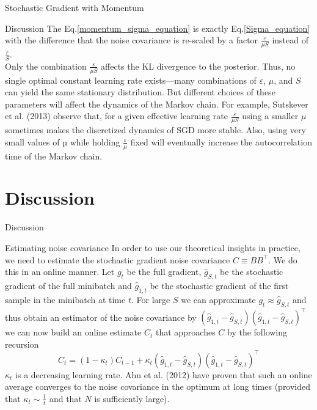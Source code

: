\documentclass{beamer}
\begin{document}
\begin{frame}{Stochastic Gradient with Momentum}
    \begin{block}{Discussion}
        The Eq.\ref{momentum_sigma_equation} is exactly Eq.\ref{Sigma_equation} with the difference that the noise covariance is re-scaled by a factor $\frac{\varepsilon}{\mu S}$ instead of $\frac{\varepsilon}{S}$. \\
        Only the combination $\frac{\varepsilon}{\mu S}$ affects the KL divergence to the posterior. Thus, no single optimal constant learning rate exists—many combinations of $\varepsilon$, $\mu$, and $S$ can yield the same stationary distribution. But different choices of these parameters will affect the dynamics of the Markov chain. For example, Sutskever et al. (2013) observe that, for a given effective learning rate $\frac{\varepsilon}{\mu S}$ using a smaller $\mu$ sometimes makes the discretized dynamics of SGD more stable. Also, using very small values of µ while holding $\frac{\varepsilon}{\mu}$ fixed will eventually increase the autocorrelation time of the Markov chain. 
    \end{block}
\end{frame}

\section{Discussion}

\begin{frame}{Discussion}
    \begin{block}{Estimating noise covariance}
        In order to use our theoretical insights in practice, we need to estimate the stochastic gradient noise covariance $C \equiv BB^\top$. We do this in an online manner. Let $g_t$ be the full gradient, $\hat{g}_{S,t}$ be the stochastic gradient of the full minibatch and $\hat{g}_{1,t}$ be the stochastic gradient of the first sample in the minibatch at time $t$. For large $S$ we can approximate $g_t \approx \hat{g}_{S,t}$ and thus obtain an estimator of the noise covariance by $(\hat{g}_{1,t} - \hat{g}_{S,t})(\hat{g}_{1,t} - \hat{g}_{S,t})^\top$ we can now build an online estimate $C_t$ that approaches $C$ by the following recursion
        \begin{equation}\label{covariance_estimation}
            C_t = (1 - \kappa_t)C_{t-1} + \kappa_t(\hat{g}_{1,t} - \hat{g}_{S,t})(\hat{g}_{1,t} - \hat{g}_{S,t})^\top
        \end{equation}
        $\kappa_t$ is a decreasing learning rate. Ahn et al. (2012) have proven that such an online average converges to the noise covariance in the optimum at long times  (provided that $\kappa_t \sim \frac{1}{t}$ and that $N$ is sufficiently large).
    \end{block}
\end{frame}
\end{document}
